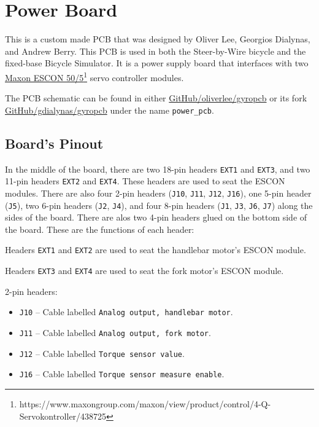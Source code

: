 \section{Power Board}
This is a custom made PCB that was designed by Oliver Lee, Georgios Dialynas, and Andrew Berry. This PCB is used in both the Steer-by-Wire bicycle and the fixed-base Bicycle Simulator. It is a power supply board that interfaces with two \href{https://www.maxongroup.com/maxon/view/product/control/4-Q-Servokontroller/438725}{Maxon ESCON 50/5}\footnote{https://www.maxongroup.com/maxon/view/product/control/4-Q-Servokontroller/438725} servo controller modules.

The PCB schematic can be found in either \href{https://github.com/oliverlee/gyropcb}{GitHub/oliverlee/gyropcb} or its fork \href{https://github.com/gdialynas/gyropcb}{GitHub/gdialynas/gyropcb} under the name \verb|power_pcb|.

\subsection{Board's Pinout}
In the middle of the board, there are two 18-pin headers \verb|EXT1| and \verb|EXT3|, and two 11-pin headers \verb|EXT2| and \verb|EXT4|. These headers are used to seat the ESCON modules. There are also four 2-pin headers (\verb|J10|, \verb|J11|, \verb|J12|, \verb|J16|), one 5-pin header (\verb|J5|), two 6-pin headers (\verb|J2|, \verb|J4|), and four 8-pin headers (\verb|J1|, \verb|J3|, \verb|J6|, \verb|J7|) along the sides of the board. There are alos two 4-pin headers glued on the bottom side of the board. These are the functions of each header:

Headers \verb|EXT1| and \verb|EXT2| are used to seat the handlebar motor's ESCON module.

Headers \verb|EXT3| and \verb|EXT4| are used to seat the fork motor's ESCON module.

2-pin headers:
\begin{itemize}[noitemsep]
  \item \verb|J10| -- Cable labelled \verb|Analog output, handlebar motor|.
  \item \verb|J11| -- Cable labelled \verb|Analog output, fork motor|.
  \item \verb|J12| -- Cable labelled \verb|Torque sensor value|.
  \item \verb|J16| -- Cable labelled \verb|Torque sensor measure enable|.
\end{itemize}

